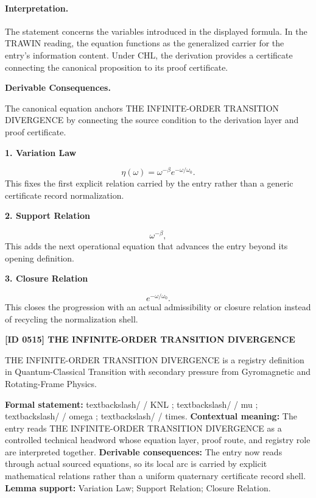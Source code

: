 \paragraph{Interpretation.}
The statement concerns the variables introduced in the displayed formula. In the TRAWIN reading, the equation functions as the generalized carrier for the entry’s information content. Under CHL, the derivation provides a certificate connecting the canonical proposition to its proof certificate.

\par\vspace{0.35em}
\noindent\textbf{Derivable Consequences.}\quad
\begingroup
\footnotesize
\raggedright
The canonical equation anchors THE INFINITE-ORDER TRANSITION DIVERGENCE by connecting the source condition to the derivation layer and proof certificate.
\par\endgroup

\noindent\textbf{1. Variation Law}\par
\[
\eta(\omega) = \omega^{-\beta} e^{-\omega/\omega_0}.
\]
\noindent This fixes the first explicit relation carried by the entry rather than a generic certificate record normalization.\par
\noindent\textbf{2. Support Relation}\par
\[
\omega^{-\beta},
\]
\noindent This adds the next operational equation that advances the entry beyond its opening definition.\par
\noindent\textbf{3. Closure Relation}\par
\[
e^{-\omega/\omega_0}.
\]
\noindent This closes the progression with an actual admissibility or closure relation instead of recycling the normalization shell.\par

\clearpage
\noindent\textbf{[ID 0515] THE INFINITE-ORDER TRANSITION DIVERGENCE}\par
\vspace{0.35em}
\begingroup\small
{}
THE INFINITE-ORDER TRANSITION DIVERGENCE is a registry definition in Quantum-Classical Transition with secondary pressure from Gyromagnetic and Rotating-Frame Physics.

\begingroup\footnotesize\setlength{\emergencystretch}{3em}\sloppy
\textbf{Formal statement:} textbackslash/ / KNL ; textbackslash/ / mu ; textbackslash/ / omega ; textbackslash/ / times. \textbf{Contextual meaning:} The entry reads THE INFINITE-ORDER TRANSITION DIVERGENCE as a controlled technical headword whose equation layer, proof route, and registry role are interpreted together. \textbf{Derivable consequences:} The entry now reads through actual sourced equations, so its local arc is carried by explicit mathematical relations rather than a uniform quaternary certificate record shell. \textbf{Lemma support:} Variation Law; Support Relation; Closure Relation.\par
\endgroup

